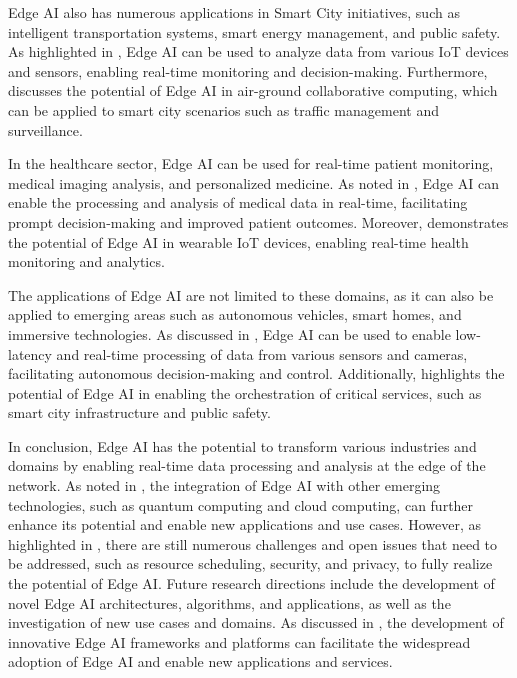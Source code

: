 \documentclass[11pt,a4paper]{article}
\begin{document}
Edge AI also has numerous applications in Smart City initiatives, such as intelligent transportation systems, smart energy management, and public safety. As highlighted in \cite{arxiv:1805.06695}, Edge AI can be used to analyze data from various IoT devices and sensors, enabling real-time monitoring and decision-making. Furthermore, \cite{arxiv:2101.07930} discusses the potential of Edge AI in air-ground collaborative computing, which can be applied to smart city scenarios such as traffic management and surveillance.

In the healthcare sector, Edge AI can be used for real-time patient monitoring, medical imaging analysis, and personalized medicine. As noted in \cite{arxiv:2004.07311}, Edge AI can enable the processing and analysis of medical data in real-time, facilitating prompt decision-making and improved patient outcomes. Moreover, \cite{arxiv:1701.08680} demonstrates the potential of Edge AI in wearable IoT devices, enabling real-time health monitoring and analytics.

The applications of Edge AI are not limited to these domains, as it can also be applied to emerging areas such as autonomous vehicles, smart homes, and immersive technologies. As discussed in \cite{arxiv:2107.13374}, Edge AI can be used to enable low-latency and real-time processing of data from various sensors and cameras, facilitating autonomous decision-making and control. Additionally, \cite{arxiv:2407.17314} highlights the potential of Edge AI in enabling the orchestration of critical services, such as smart city infrastructure and public safety.

In conclusion, Edge AI has the potential to transform various industries and domains by enabling real-time data processing and analysis at the edge of the network. As noted in \cite{arxiv:2405.04824}, the integration of Edge AI with other emerging technologies, such as quantum computing and cloud computing, can further enhance its potential and enable new applications and use cases. However, as highlighted in \cite{arxiv:2108.08059}, there are still numerous challenges and open issues that need to be addressed, such as resource scheduling, security, and privacy, to fully realize the potential of Edge AI. Future research directions include the development of novel Edge AI architectures, algorithms, and applications, as well as the investigation of new use cases and domains. As discussed in \cite{arxiv:2502.11644}, the development of innovative Edge AI frameworks and platforms can facilitate the widespread adoption of Edge AI and enable new applications and services.
\end{document}
